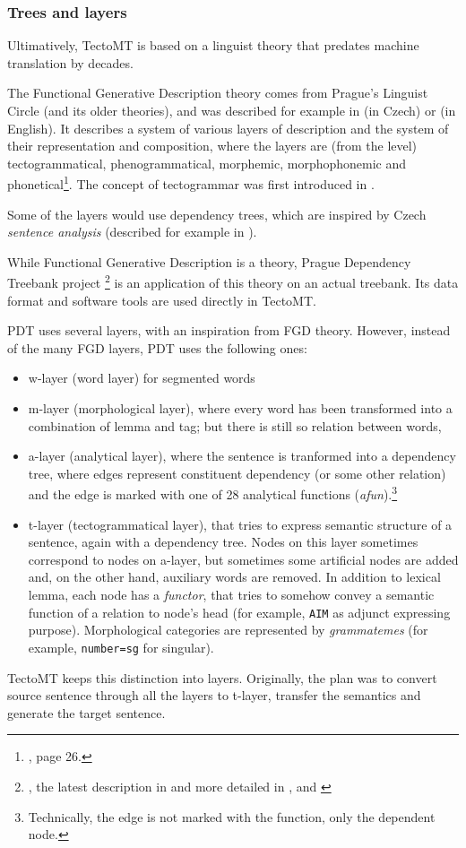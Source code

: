 \subsubsection{Trees and layers}
Ultimatively, TectoMT is based on a linguist theory that predates machine translation by decades.

The Functional Generative Description theory comes from Prague's Linguist Circle (and its older theories), and was described for example in \cite{sgallczech} (in Czech) or \cite{sgallenglish} (in English). It describes a system of various layers of description and the system of their representation and composition, where the layers are (from the  level) tectogrammatical, phenogrammatical, morphemic, morphophonemic and phonetical\footnote{\cite{sgallenglish}, page 26.}. The concept of tectogrammar was first introduced in \cite{curry}.

Some of the layers would use dependency trees, which are inspired by Czech \emph{sentence analysis} (described for example in \cite{smilauer}).

While Functional Generative Description is a theory, Prague Dependency Treebank project \footnote{\cite{pdt_soft}, the latest description in \cite{pdt_desc} and more detailed in \cite{pdt_manual_a}, \cite{pdt_manual_m} and \cite{pdt_manual_t}} is an application of this theory on an actual treebank. Its data format and software tools are used directly in TectoMT.

PDT uses several layers, with an inspiration from FGD theory. However, instead of the many FGD layers, PDT uses the following ones:
\begin{itemize}
\item w-layer (word layer) for segmented words
\item m-layer (morphological layer), where every word has been transformed into a combination of lemma and tag; but there is still so relation between words,
\item a-layer (analytical layer), where the sentence is tranformed into a dependency tree, where edges represent constituent dependency (or some other relation) and the edge is marked with one of 28 analytical functions (\emph{afun}).\footnote{Technically, the edge is not marked with the function, only the dependent node.}
\item t-layer (tectogrammatical layer), that tries to express semantic structure of a sentence, again with a dependency tree. Nodes on this layer sometimes correspond to nodes on a-layer, but sometimes some artificial nodes are added and, on the other hand, auxiliary words are removed. In addition to lexical lemma, each node has a \emph{functor}, that tries to somehow convey a semantic function of a relation to node's head (for example, \texttt{AIM} as adjunct expressing purpose). Morphological categories are represented by \emph{grammatemes} (for example, \texttt{number=sg} for singular).
\end{itemize}

TectoMT keeps this distinction into layers. Originally, the plan was to convert source sentence through all the layers to t-layer, transfer the semantics and generate the target sentence.


